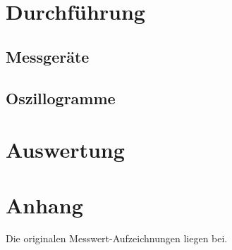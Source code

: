 \documentclass[numbers=noenddot,12pt,a4paper]{scrartcl}
\begin{document}
\section{Durchführung}
\subsection{Messgeräte}
\subsection{Oszillogramme}
\section{Auswertung}
\section{Anhang}
Die originalen Messwert-Aufzeichnungen liegen bei.
\end{document}
